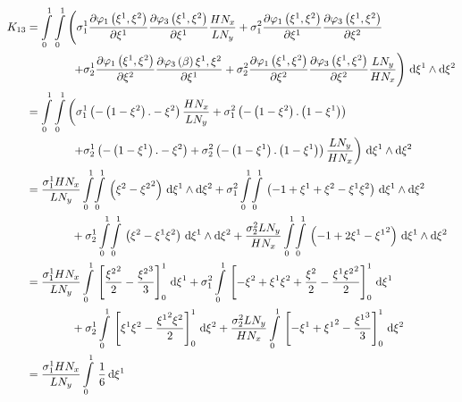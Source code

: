 \begin{equation}
  \begin{aligned}
    K_{13}&=\dintl{0}{1}\dintl{0}{1}\left(
    \conductivitytensorsymbol^{1}_{1}\delby{\lbfn{1}{\xione,\xitwo}}{\xione}
    \delby{\lbfn{3}{\xione,\xitwo}}{\xione}\dfrac{H N_{x}}{L N_{y}}+
    \conductivitytensorsymbol^{2}_{1}\delby{\lbfn{1}{\xione,\xitwo}}{\xione}
    \delby{\lbfn{3}{\xione,\xitwo}}{\xitwo}\right.\\
    &\qquad\qquad\left.+\conductivitytensorsymbol^{1}_{2}\delby{\lbfn{1}{\xione,\xitwo}}{\xitwo}
    \delby{\lbfn{3}{\beta}{\xione,\xitwo}}{\xione}+
    \conductivitytensorsymbol^{2}_{2}\delby{\lbfn{1}{\xione,\xitwo}}{\xitwo}
    \delby{\lbfn{3}{\xione,\xitwo}}{\xitwo}\dfrac{L N_{y}}{H N_{x}}\right)\infinitesimaltwo{\xione}{\xitwo}\\
    &=\dintl{0}{1}\dintl{0}{1}\left(
    \conductivitytensorsymbol^{1}_{1}\pbrac{-\pbrac{1-\xitwo}.-\xitwo}\dfrac{H N_{x}}{L N_{y}}+
    \conductivitytensorsymbol^{2}_{1}\pbrac{-\pbrac{1-\xitwo}.\pbrac{1-\xione}}\right.\\
    &\qquad\qquad\left.+\conductivitytensorsymbol^{1}_{2}\pbrac{-\pbrac{1-\xione}.-\xitwo}+
    \conductivitytensorsymbol^{2}_{2}\pbrac{-\pbrac{1-\xione}.\pbrac{1-\xione}}\dfrac{L N_{y}}{H N_{x}}\right)
    \infinitesimaltwo{\xione}{\xitwo}\\
    &=\dfrac{\conductivitytensorsymbol^{1}_{1} H N_{x}}{L N_{y}}\giint{0}{1}{0}{1}{\pbrac{\xitwo-\xitwosq}}{\xione}{\xitwo}
    +\conductivitytensorsymbol^{2}_{1}\giint{0}{1}{0}{1}{\pbrac{-1+\xione+\xitwo-\xione\xitwo}}{\xione}{\xitwo}\\
    &\qquad\qquad+\conductivitytensorsymbol^{1}_{2}\giint{0}{1}{0}{1}{\pbrac{\xitwo-\xione\xitwo}}{\xione}{\xitwo}
    +\dfrac{\conductivitytensorsymbol^{2}_{2} L N_{y}}{H N_{x}}\giint{0}{1}{0}{1}{\pbrac{-1+2\xione-\xionesq}}{\xione}{\xitwo} \\
    &=\dfrac{\conductivitytensorsymbol^{1}_{1} H N_{x}}{L N_{y}}\gint{0}{1}{\sqbrac{\dfrac{\xitwosq}{2}-\dfrac{\xitwocube}{3}}^{1}_{0}}{\xione}
    +\conductivitytensorsymbol^{2}_{1}\gint{0}{1}{\sqbrac{-\xitwo+\xione\xitwo+\dfrac{\xitwo}{2}-\dfrac{\xione\xitwosq}{2}}^{1}_{0}}{\xione}\\
    &\qquad\qquad+\conductivitytensorsymbol^{1}_{2}\gint{0}{1}{\sqbrac{\xione\xitwo-\dfrac{\xionesq\xitwo}{2}}^{1}_{0}}{\xitwo}
    +\dfrac{\conductivitytensorsymbol^{2}_{2} L N_{y}}{H N_{x}}\gint{0}{1}{\sqbrac{-\xione+\xionesq-\dfrac{\xionecube}{3}}^{1}_{0}}{\xitwo} \\
    &=\dfrac{\conductivitytensorsymbol^{1}_{1} H N_{x}}{L N_{y}}\gint{0}{1}{\dfrac{1}{6}}{\xione}

\end{aligned}
\end{equation}

